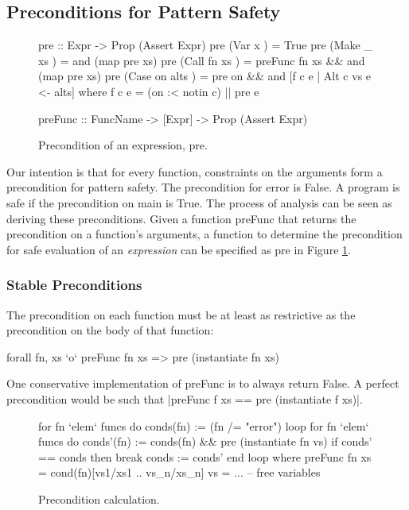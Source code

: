 \documentclass[preprint]{sigplanconf}
\newcommand{\C}[1]{\textsf{#1}}
\begin{document}
\subsection{Preconditions for Pattern Safety}
\label{sec:precond}

\begin{figure}
\begin{code}
pre :: Expr -> Prop (Assert Expr)
pre (Var   x         ) = True
pre (Make  _   xs    ) = and (map pre xs)
pre (Call  fn  xs    ) = preFunc fn xs && and (map pre xs)
pre (Case  on  alts  ) = pre on && and [f c e | Alt c vs e <- alts]
    where f c e = (on :< notin c) || pre e

preFunc :: FuncName -> [Expr] -> Prop (Assert Expr)
\end{code}
\caption{Precondition of an expression, \C{pre}.}
\label{fig:precondition}
\end{figure}

Our intention is that for every function, constraints on the arguments form a precondition for pattern safety. The precondition for \C{error} is False. A program is safe if the precondition on \C{main} is True. The process of analysis can be seen as deriving these preconditions. Given a function \C{preFunc} that returns the precondition on a function's arguments, a function to determine the precondition for safe evaluation of an \textit{expression} can be specified as \C{pre} in Figure \ref{fig:precondition}.

\subsubsection{Stable Preconditions}

The precondition on each function must be at least as restrictive as the precondition on the body of that function:

\begin{code}
forall fn, xs `o` preFunc fn xs => pre (instantiate fn xs)
\end{code}

One conservative implementation of \C{preFunc} is to always return False. A perfect precondition would be such that |preFunc f xs == pre (instantiate f xs)|.

\begin{figure}
\begin{code}
for fn `elem` funcs do conds(fn) := (fn /= "error")
loop
    for fn `elem` funcs do
        conds'(fn) := conds(fn) && pre (instantiate fn vs)
    if conds' == conds then break
    conds := conds'
end loop
    where
        preFunc fn xs = cond(fn)[vs1/xs1 .. vs_n/xs_n]
        vs = ... -- free variables
\end{code}
\caption{Precondition calculation.}
\label{fig:precond_fixp}
\end{figure}
\end{document}
